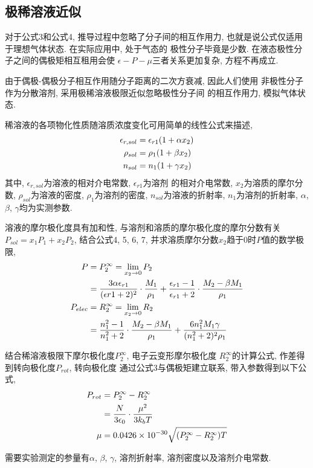 \documentclass[a4paper]{article}
\begin{document}
\subsection{极稀溶液近似}
对于公式3和公式4, 推导过程中忽略了分子间的相互作用力, 
也就是说公式仅适用于理想气体状态. 在实际应用中, 处于气态的
极性分子毕竟是少数. 在液态极性分子之间的偶极矩相互租用会使
$\epsilon-P-\mu$三者关系更加复杂, 方程不再成立.
\par
由于偶极-偶极分子相互作用随分子距离的二次方衰减, 因此人们使用
非极性分子作为分散溶剂, 采用极稀溶液极限近似忽略极性分子间
的相互作用力, 模拟气体状态.
\par
稀溶液的各项物化性质随溶质浓度变化可用简单的线性公式来描述, 
\begin{equation}
	\centering
	\begin{aligned}
		\epsilon_{r, sol} &= \epsilon_{r1}(1+\alpha x_{2})\\
		\rho_{sol} &= \rho_{1}(1+\beta x_{2})\\
		n_{sol} &= n_{1}(1+\gamma x_{2})\\
	\end{aligned}
\end{equation}
其中, $\epsilon_{r, sol}$为溶液的相对介电常数, $\epsilon_{r1}$为溶剂
的相对介电常数, $x_{2}$为溶质的摩尔分数, $\rho_{sol}$为溶液的密度, 
$\rho_{1}$为溶剂的密度, $n_{sol}$为溶液的折射率, $n_{1}$为溶剂的折射率, 
$\alpha$, $\beta$, $\gamma$均为实测参数.
\par
溶液的摩尔极化度具有加和性, 与溶剂和溶质的摩尔极化度的摩尔分数有关
$P_{sol} = x_{1}P_{1}+x_{2}P_{2}$, 
结合公式4, 5, 6, 7, 并求溶质摩尔分数$x_{2}$趋于0时$P$值的数学极限, 
\begin{equation}
	\centering
	\begin{aligned}
		P &= P_{2}^{\infty} = \lim\limits_{x_{2}\to 0} P_{2}\\
	  &=\frac{3\alpha\epsilon_{r1}}{(\epsilon{r1}+2)^{2}}\cdot \frac{M_{1}}{\rho_{1}}
	  + \frac{\epsilon_{r1}-1}{\epsilon_{r1}+2}\cdot \frac{M_{2}-\beta M_{1}}{\rho_{1}}\\
	P_{elec} &= R_{2}^{\infty} = \lim\limits_{x_{2}\to 0}R_{2}\\
			 &=\frac{n_{1}^{2}-1}{n_{1}^{2}+2}\cdot \frac{M_{2}-\beta M_{1}}{\rho_{1}}
			 +\frac{6n_{1}^{2}M_{1}\gamma}{(n_{1}^{2}+2)^{2}\rho_{1}}\\
	\end{aligned}
\end{equation}
\par
结合稀溶液极限下摩尔极化度$P_{2}^{\infty}$, 电子云变形摩尔极化度
$R_{2}^{\infty}$的计算公式, 作差得到转向极化度$P_{rot}$, 转向极化度
通过公式3与偶极矩建立联系, 带入参数得到以下公式, 
\begin{equation}
	\centering
	\begin{aligned}
		P_{rot} &= P_{2}^{\infty} - R_{2}^{\infty}\\
				&=\frac{N}{3\epsilon_{0}}\cdot \frac{\mu^{2}}{3k_{b}T}\\
		\mu &= 0.0426\times 10^{-30} \sqrt{(P_{2}^{\infty} - R_{2}^{\infty})T}\\
	\end{aligned}
\end{equation}
\par
需要实验测定的参量有$\alpha$, $\beta$, $\gamma$, 溶剂折射率, 溶剂密度以及溶剂介电常数.
\end{document}
